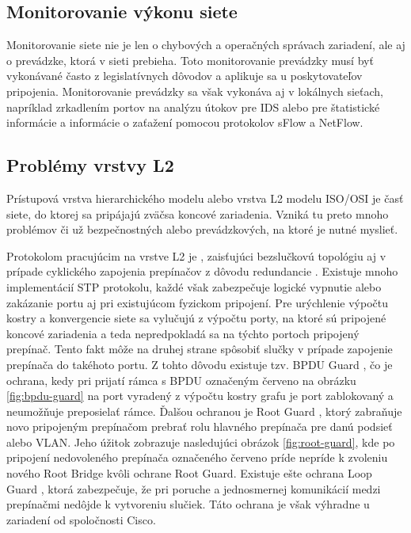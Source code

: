 \subsection*{Monitorovanie výkonu siete}
Monitorovanie siete nie je len o chybových a operačných správach zariadení, ale aj o prevádzke, ktorá v sieti prebieha. Toto monitorovanie prevádzky musí byť vykonávané často z legislatívnych dôvodov a aplikuje sa u poskytovateľov pripojenia. Monitorovanie prevádzky sa však vykonáva aj v lokálnych sieťach, napríklad zrkadlením portov \cite{Singh2018} na analýzu útokov pre IDS alebo pre štatistické informácie a informácie o zaťažení pomocou protokolov sFlow a NetFlow.

\subsection*{Problémy vrstvy L2}
Prístupová vrstva hierarchického modelu alebo vrstva L2 modelu ISO/OSI je časť siete, do ktorej sa pripájajú zväčsa koncové zariadenia. Vzniká tu preto mnoho problémov či už bezpečnostných alebo prevádzkových, na ktoré je nutné myslieť.

Protokolom pracujúcim na vrstve L2 je , zaisťujúci bezslučkovú topológiu aj v prípade cyklického zapojenia prepínačov z dôvodu redundancie \cite{Lammle2013}. Existuje mnoho implementácií STP protokolu, každé však zabezpečuje logické vypnutie alebo zakázanie portu aj pri existujúcom fyzickom pripojení. Pre urýchlenie výpočtu kostry a konvergencie siete sa vylučujú z výpočtu porty, na ktoré sú pripojené koncové zariadenia a teda nepredpokladá sa na týchto portoch pripojený prepínač. Tento fakt môže na druhej strane spôsobiť slučky v prípade zapojenie prepínača do takéhoto portu. Z tohto dôvodu existuje tzv. BPDU Guard \cite{Lammle2013}, čo je ochrana, kedy pri prijatí rámca s BPDU označeným červeno na obrázku  \ref{fig:bpdu-guard} na port vyradený z výpočtu kostry grafu je port zablokovaný a neumožňuje preposielať rámce. Ďalšou ochranou je Root Guard \cite{Vyncke2008}, ktorý zabraňuje novo pripojeným prepínačom prebrať rolu hlavného prepínača pre danú podsieť alebo VLAN. Jeho úžitok zobrazuje nasledujúci obrázok \ref{fig:root-guard}, kde po pripojení nedovoleného prepínača označeného červeno príde nepríde k zvoleniu nového Root Bridge kvôli ochrane Root Guard. Existuje ešte ochrana Loop Guard \cite{Vyncke2008}, ktorá zabezpečuje, že pri poruche a jednosmernej komunikácií medzi prepínačmi nedôjde k vytvoreniu slučiek. Táto ochrana je však výhradne u zariadení od spoločnosti Cisco. 

